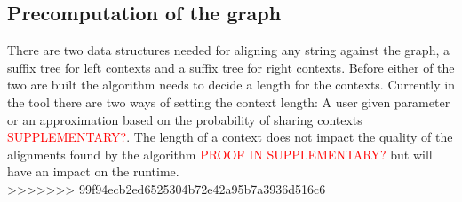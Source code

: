 \documentclass{article}
\begin{document}
\subsection{Precomputation of the graph}
There are two data structures needed for aligning any string against the graph, a suffix tree for left contexts and a suffix tree for right contexts. Before either of the two are built the algorithm needs to decide a length for the contexts. Currently in the tool there are two ways of setting the context length: A user given parameter or an approximation based on the probability of sharing contexts \textcolor{red}{SUPPLEMENTARY?}. The length of a context does not impact the quality of the alignments found by the algorithm \textcolor{red}{PROOF IN SUPPLEMENTARY?} but will have an impact on the runtime.\\
>>>>>>> 99f94ecb2ed6525304b72e42a95b7a3936d516c6
\par\noindent
\end{document}
